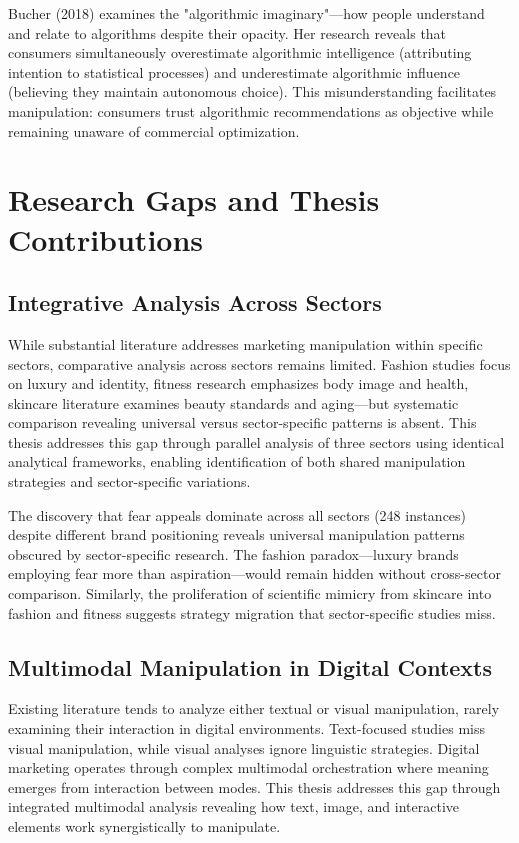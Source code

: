 Bucher (2018) examines the "algorithmic imaginary"—how people understand and relate to algorithms despite their opacity. Her research reveals that consumers simultaneously overestimate algorithmic intelligence (attributing intention to statistical processes) and underestimate algorithmic influence (believing they maintain autonomous choice). This misunderstanding facilitates manipulation: consumers trust algorithmic recommendations as objective while remaining unaware of commercial optimization.

\section{Research Gaps and Thesis Contributions}
\label{sec:gaps}

\subsection{Integrative Analysis Across Sectors}

While substantial literature addresses marketing manipulation within specific sectors, comparative analysis across sectors remains limited. Fashion studies focus on luxury and identity, fitness research emphasizes body image and health, skincare literature examines beauty standards and aging—but systematic comparison revealing universal versus sector-specific patterns is absent. This thesis addresses this gap through parallel analysis of three sectors using identical analytical frameworks, enabling identification of both shared manipulation strategies and sector-specific variations.

The discovery that fear appeals dominate across all sectors (248 instances) despite different brand positioning reveals universal manipulation patterns obscured by sector-specific research. The fashion paradox—luxury brands employing fear more than aspiration—would remain hidden without cross-sector comparison. Similarly, the proliferation of scientific mimicry from skincare into fashion and fitness suggests strategy migration that sector-specific studies miss.

\subsection{Multimodal Manipulation in Digital Contexts}

Existing literature tends to analyze either textual or visual manipulation, rarely examining their interaction in digital environments. Text-focused studies miss visual manipulation, while visual analyses ignore linguistic strategies. Digital marketing operates through complex multimodal orchestration where meaning emerges from interaction between modes. This thesis addresses this gap through integrated multimodal analysis revealing how text, image, and interactive elements work synergistically to manipulate.

